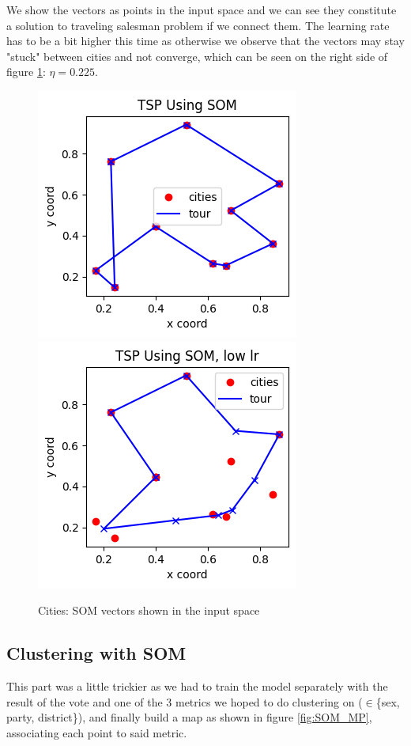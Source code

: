 \documentclass[a4paper]{article}
\begin{document}
We show the vectors as points in the input space and we can see they constitute a solution to traveling salesman problem if we connect them. The learning rate has to be a bit higher this time as otherwise we observe that the vectors may stay "stuck" between cities and not converge, which can be seen on the right side of figure \ref{fig:SOM_TSP}: $\eta = 0.225$.

\begin{figure}[h!]
    \centering
    \includegraphics[width=.33\linewidth]{img/SOM_tsp.png}
    \includegraphics[width=.33\linewidth]{img/SOM_tsp_low_lr.png}
    \caption{Cities: SOM vectors shown in the input space}
    \label{fig:SOM_TSP}
\end{figure}

\subsection{Clustering with SOM}
This part was a little trickier as we had to train the model separately with the result of the vote and one of the 3 metrics we hoped to do clustering on ($\in$\{sex, party, district\}), and finally build a map as shown in figure \ref{fig:SOM_MP}, associating each point to said metric.
\end{document}
